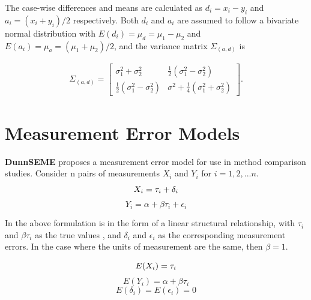 \documentclass[12pt, a4paper]{report}
\theoremstyle{plain}
\theoremstyle{definition}
\theoremstyle{remark}
\begin{document}
	
	The case-wise differences and means are calculated as $d_{i} =
	x_{i}-y_{i}$ and $a_{i} = (x_{i}+y_{i})/2$  respectively. Both
	$d_{i}$ and $a_{i}$ are assumed to follow a bivariate normal
	distribution with $E(d_{i})= \mu_{d} = \mu_{1} - \mu_{2}$ and
	$E(a_{i})= \mu_{a} = (\mu_{1} + \mu_{2})/2$, and the variance matrix
	$\Sigma_{(a,d)}$ is
	
	\begin{eqnarray}
		\Sigma_{(a,d)}= \left[\begin{matrix}
			\sigma^{2}_{1}+\sigma^{2}_{2}&\frac{1}{2}(\sigma^{2}_{1}-\sigma^{2}_{2})\\
			\frac{1}{2}(\sigma^{2}_{1}-\sigma^{2}_{2})&\sigma^{2}+
			\frac{1}{4}(\sigma^{2}_{1}+\sigma^{2}_{2})
		\end{matrix} \right].
	\end{eqnarray}
	
	\newpage
	\section{Measurement Error Models}
	\textbf{DunnSEME} proposes a measurement error model for use in
	method comparison studies. Consider n pairs of measurements
	$X_{i}$ and $Y_{i}$ for $i=1,2,...n$.
	\begin{equation}
		X_{i} = \tau_{i}+\delta_{i}\\
	\end{equation}
	\begin{equation}
		Y_{i} = \alpha +\beta\tau_{i}+\epsilon_{i} \nonumber
	\end{equation}
	
	In the above formulation is in the form of a linear structural
	relationship, with $\tau_{i}$ and $\beta\tau_{i}$ as the true
	values , and $\delta_{i}$ and $\epsilon_{i}$ as the corresponding
	measurement errors. In the case where the units of measurement are
	the same, then $\beta =1$.
	
	\begin{equation}
		E(X_{i}) = \tau_{i}\\
	\end{equation}
	\begin{equation}
		E(Y_{i}) = \alpha +\beta\tau_{i} \nonumber
	\end{equation}
	\begin{equation}
		E(\delta_{i}) = E(\epsilon_{i}) = 0 \nonumber
	\end{equation}
	
\end{document}
